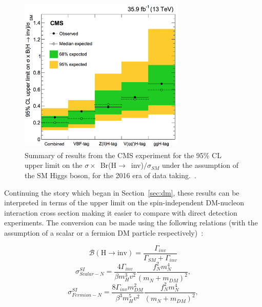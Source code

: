 \begin{figure}[htbp]
    \begin{center}
        \includegraphics[width=0.7\textwidth]{Theory/Limit2016.png}
        \caption{Summary of results from the CMS experiment for the 95\% CL upper limit on the $\sigma \times$~Br(H$\rightarrow$~inv)$/\sigma_{SM}$ under the assumption of the SM Higgs boson, for the 2016 era of data taking.~\cite{paper:HIG_17_023}.}
      \label{fig:limit_2016}
    \end{center}
  \end{figure}
\hspace{10pt} Continuing the story which began in Section~\ref{sec:dm}, these results can be interpreted in terms of the upper limit on the spin-independent DM-nucleon interaction cross section making it easier to compare with direct detection experiments. The conversion can be made using the following relations (with the assumption of a scalar or a fermion DM particle respectively)~\cite{paper:hinv_run1,paper:hig_portal_models1}:

\begin{equation}
    \mathcal{B}(\text{H}\rightarrow \text{inv}) = \frac{\Gamma_{inv}}{\Gamma_{SM}+\Gamma_{inv}}
\end{equation}
\begin{equation}
    \sigma^{SI}_{Scalar-N} = \frac{4\Gamma_{inv}}{\beta m^3_Hv^2}\frac{f_N^2m_N^4}{(m_N+m_{DM})^2},
\end{equation}
\begin{equation}
    \sigma^{SI}_{Fermion-N} = \frac{8\Gamma_{inv}m_{DM}^2}{\beta^3m^5_Hv^2}\frac{f_N^2m_N^4}{(m_N+m_{DM})^2},
\end{equation}

